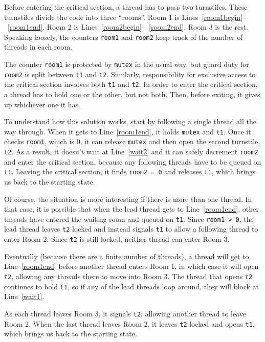 \documentclass{book}
\begin{document}
Before entering the critical section, a thread has to pass two
turnstiles.  These turnstiles divide the code into three ``rooms''.
Room 1 is Lines~\ref{room1begin}--~\ref{room1end}.  Room 2 is
Lines~\ref{room2begin}--~\ref{room2end}.  Room 3 is the rest.
Speaking loosely, the counters {\tt room1} and {\tt room2} keep track
of the number of threads in each room.

The counter {\tt room1} is protected by {\tt mutex} in the usual way,
but guard duty for {\tt room2} is split between {\tt t1} and {\tt t2}.
Similarly, responsibility for exclusive access to the critical section
involves both {\tt t1} and {\tt t2}.  In order to enter the critical
section, a thread has to hold one or the other, but not both.  Then,
before exiting, it gives up whichever one it has.

To understand how this solution works, start by following a single
thread all the way through.  When it gets to Line~\ref{room1end}, it
holds {\tt mutex} and {\tt t1}.  Once it checks {\tt room1}, which is
0, it can release {\tt mutex} and then open the second turnstile, {\tt
        t2}.  As a result, it doesn't wait at Line~\ref{wait2} and it can
safely decrement {\tt room2} and enter the critical section, because
any following threads have to be queued on {\tt t1}.  Leaving the
critical section, it finds {\tt room2 = 0} and releases {\tt t1},
which brings us back to the starting state.

Of course, the situation is more interesting if there is more than one
thread.  In that case, it is possible that when the lead thread gets
to Line~\ref{room1end}, other threads have entered the waiting room
and queued on {\tt t1}.  Since {\tt room1 > 0}, the lead thread leaves
    {\tt t2} locked and instead signals {\tt t1} to allow a following
thread to enter Room 2.  Since {\tt t2} is still locked, neither
thread can enter Room 3.

Eventually (because there are a finite number of threads), a thread
will get to Line~\ref{room1end} before another thread enters Room 1, in which
case it will open {\tt t2}, allowing any threads there to move into
Room 3.  The thread that opens {\tt t2} continues to hold {\tt t1}, so
if any of the lead threads loop around, they will block at Line~\ref{wait1}.

As each thread leaves Room 3, it signals {\tt t2}, allowing another
thread to leave Room 2.  When the last thread leaves Room 2, it leaves
    {\tt t2} locked and opens {\tt t1}, which brings us back to the
starting state.
\end{document}

